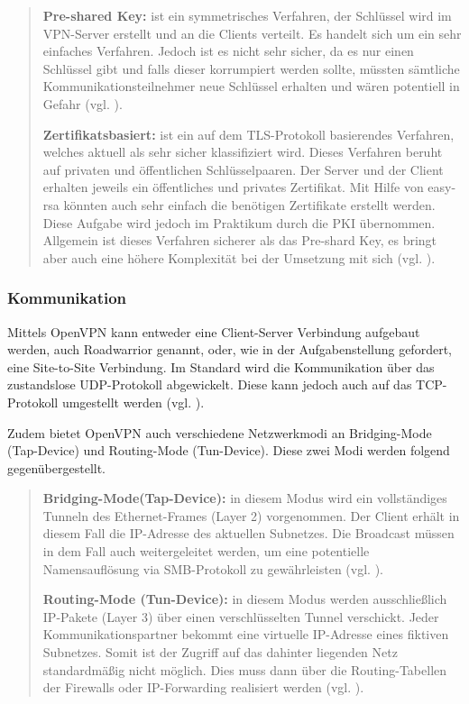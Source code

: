 \documentclass[
a4paper,     %
 headsepline, %
footsepline, %
titlepage,   %
 halfparskip,     %
 fleqn,       %
12pt         %
]{scrartcl}  %
\begin{document}
\begin{quotation}
\item[\textbf{Pre-shared Key:}]
ist ein symmetrisches Verfahren, der Schlüssel wird im VPN-Server erstellt und an die Clients verteilt. Es handelt sich um ein sehr einfaches Verfahren. Jedoch ist es nicht sehr sicher, da es nur einen Schlüssel gibt und falls dieser korrumpiert werden sollte, müssten sämtliche Kommunikationsteilnehmer neue Schlüssel erhalten und wären potentiell in Gefahr (vgl. \cite{openV-1}). 

\item[\textbf{Zertifikatsbasiert:}]
ist ein auf dem TLS-Protokoll basierendes Verfahren, welches aktuell als sehr sicher klassifiziert wird. Dieses Verfahren beruht auf privaten und öffentlichen Schlüsselpaaren. Der Server und der Client erhalten jeweils ein öffentliches und privates Zertifikat. Mit Hilfe von easy-rsa könnten auch sehr einfach die benötigen Zertifikate erstellt werden. Diese Aufgabe wird jedoch im Praktikum durch die PKI übernommen. Allgemein ist dieses Verfahren sicherer als das Pre-shard Key, es bringt aber auch eine höhere Komplexität bei der Umsetzung mit sich (vgl. \cite{openV-1}). 
\end{quotation} 

\subsubsection{Kommunikation}

Mittels OpenVPN kann entweder eine Client-Server Verbindung aufgebaut werden, auch Roadwarrior genannt, oder, wie in der Aufgabenstellung gefordert, eine Site-to-Site Verbindung. Im Standard wird die Kommunikation über das zustandslose UDP-Protokoll abgewickelt. Diese kann jedoch auch auf das TCP-Protokoll umgestellt werden (vgl. \cite{openV-1}). 

Zudem bietet OpenVPN auch verschiedene Netzwerkmodi an Bridging-Mode (Tap-Device) und Routing-Mode (Tun-Device). 
Diese zwei Modi werden folgend gegenübergestellt. 

\begin{quotation}
\item[\textbf{Bridging-Mode(Tap-Device):}]
in diesem Modus wird ein vollständiges Tunneln des Ethernet-Frames (Layer 2) vorgenommen. Der Client erhält in diesem Fall die IP-Adresse des aktuellen Subnetzes. Die Broadcast müssen in dem Fall auch weitergeleitet werden, um eine potentielle Namensauflösung via SMB-Protokoll zu gewährleisten (vgl. \cite{openV-1}).

\item[\textbf{Routing-Mode (Tun-Device):}]
in diesem Modus werden ausschließlich IP-Pakete (Layer 3) über einen verschlüsselten Tunnel verschickt. Jeder Kommunikationspartner bekommt eine virtuelle IP-Adresse eines fiktiven Subnetzes. Somit ist der Zugriff auf das dahinter liegenden Netz standardmäßig nicht möglich. Dies muss dann über die Routing-Tabellen der Firewalls  oder IP-Forwarding realisiert werden (vgl. \cite{openV-1}).
\end{quotation}
\end{document}
